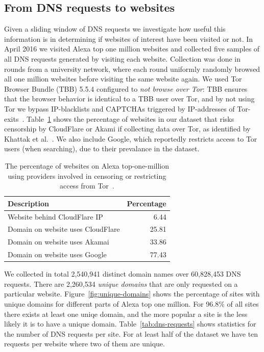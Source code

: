 \subsection{From DNS requests to websites}
\label{sec:dns2site}
Given a sliding window of DNS requests we investigate
how useful this information is in determining if websites of interest have
been visited or not. In April 2016 we visited Alexa top one million websites
and collected five samples of all DNS requests generated by visiting each
website.
Collection was done in rounds from a university network, where
each round uniformly randomly browsed all one million websites before visiting
the same website again. We used Tor Browser Bundle (TBB) 5.5.4
configured to \emph{not browse over Tor}: TBB ensures that the browser behavior
is identical to a TBB user over Tor, and by not using Tor we bypass
IP-blacklists and CAPTCHAs triggered by IP-addresses of
Tor-exits~\cite{Khattak2016a}.
Table~\ref{tab:dns-censor} shows the percentage of websites in our dataset that
risks censorship by CloudFlare or Akami if collecting data over Tor, as
identified by Khattak et al.~\cite{Khattak2016a}. We also include Google, which
reportedly restricts access to Tor users (when searching), due to
their prevalance in the dataset.

\begin{table}[t]
	\centering
	\caption{The percentage of websites on Alexa top-one-million using providers
	involved in censoring or restricting access from Tor~\cite{Khattak2016a}.}
	\begin{tabular}{l r}
	\toprule
	\textbf{Description} & \textbf{Percentage} \\
	\midrule
	Website behind CloudFlare IP & 6.44 \\
	Domain on website uses CloudFlare & 25.81 \\
	Domain on website uses Akamai & 33.86 \\
	Domain on website uses Google & 77.43 \\
	\bottomrule
	\end{tabular}
	\label{tab:dns-censor}
\end{table}

We collected in total 2,540,941 distinct domain names over 60,828,453 DNS
requests. There are 2,260,534 \emph {unique domains} that are only requested on
a particular website. Figure~\ref{fig:unique-domains} shows the percentage of
sites with unique domains for different parts of Alexa top one million.
For 96.8\% of all sites there exists at least one uniqe domain, and the more
popular a site is the less likely it is to have a unique domain.
Table~\ref{tab:dns-requests} shows statistics for the number of DNS requests per
site. For at least half of the dataset we have ten requests per website where
two of them are unique.

